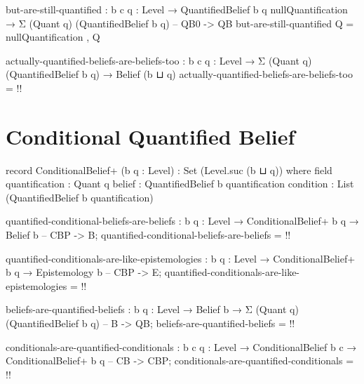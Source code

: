 \documentclass{article}
\begin{document}
\begin{code}
but-are-still-quantified :
  {b c q : Level} →
  QuantifiedBelief b {q} nullQuantification →
  Σ (Quant q) (QuantifiedBelief b {q}) -- QB0 -> QB
but-are-still-quantified Q = nullQuantification , Q
\end{code}

\begin{code}
actually-quantified-beliefs-are-beliefs-too :
  {b c q : Level} → Σ (Quant q) (QuantifiedBelief b {q}) → Belief (b ⊔ q)
actually-quantified-beliefs-are-beliefs-too = {!!}
\end{code}

\section{Conditional Quantified Belief}

\begin{code}
record ConditionalBelief+ (b q : Level) : Set (Level.suc (b ⊔ q)) where
  field
    quantification : Quant q
    belief : QuantifiedBelief b quantification
    condition : List (QuantifiedBelief b quantification)
\end{code}

\begin{code}
quantified-conditional-beliefs-are-beliefs :
  {b q : Level} → ConditionalBelief+ b q → Belief b -- CBP -> B;
quantified-conditional-beliefs-are-beliefs = {!!}
\end{code}

\begin{code}
quantified-conditionals-are-like-epistemologies :
  {b q : Level} → ConditionalBelief+ b q → Epistemology b -- CBP -> E;
quantified-conditionals-are-like-epistemologies = {!!}
\end{code}

\begin{code}
beliefs-are-quantified-beliefs :
  {b q : Level} → Belief b → Σ (Quant q) (QuantifiedBelief b {q}) -- B -> QB;
beliefs-are-quantified-beliefs = {!!}
\end{code}

\begin{code}
conditionals-are-quantified-conditionals :
  {b c q : Level} → ConditionalBelief b c → ConditionalBelief+ b q -- CB -> CBP;
conditionals-are-quantified-conditionals = {!!}
\end{code}
\end{document}
